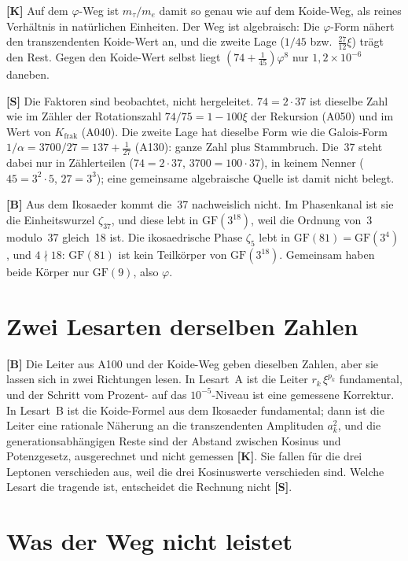 \textbf{[K]} Auf dem $\varphi$-Weg ist $m_\tau/m_e$ damit so genau wie auf dem
Koide-Weg, als reines Verhältnis in natürlichen Einheiten. Der Weg ist
algebraisch: Die $\varphi$-Form nähert den transzendenten Koide-Wert an, und
die zweite Lage ($1/45$ bzw.\ $\tfrac{27}{12}\xi$) trägt den Rest. Gegen den
Koide-Wert selbst liegt $(74+\tfrac1{45})\varphi^8$ nur $1{,}2\times10^{-6}$
daneben.

\textbf{[S]} Die Faktoren sind beobachtet, nicht hergeleitet. $74=2\cdot37$ ist
dieselbe Zahl wie im Zähler der Rotationszahl $74/75=1-100\xi$ der Rekursion
(A050) und im Wert von $K_\text{frak}$ (A040). Die zweite Lage hat dieselbe
Form wie die Galois-Form $1/\alpha=3700/27=137+\tfrac1{27}$ (A130): ganze Zahl
plus Stammbruch. Die~37 steht dabei nur in Zählerteilen ($74=2\cdot37$,
$3700=100\cdot37$), in keinem Nenner ($45=3^2\cdot5$, $27=3^3$); eine
gemeinsame algebraische Quelle ist damit nicht belegt.

\textbf{[B]} Aus dem Ikosaeder kommt die~37 nachweislich nicht. Im Phasenkanal
ist sie die Einheitswurzel $\zeta_{37}$, und diese lebt in
$\mathrm{GF}(3^{18})$, weil die Ordnung von~3 modulo~37 gleich~18 ist. Die
ikosaedrische Phase $\zeta_5$ lebt in $\mathrm{GF}(81)=\mathrm{GF}(3^4)$, und
$4\nmid18$: $\mathrm{GF}(81)$ ist kein Teilkörper von $\mathrm{GF}(3^{18})$.
Gemeinsam haben beide Körper nur $\mathrm{GF}(9)$, also $\varphi$.

\section{Zwei Lesarten derselben Zahlen}

\textbf{[B]} Die Leiter aus A100 und der Koide-Weg geben dieselben Zahlen, aber
sie lassen sich in zwei Richtungen lesen. In Lesart~A ist die
Leiter $r_k\,\xi^{p_k}$ fundamental, und der Schritt vom Prozent- auf das
$10^{-5}$-Niveau ist eine gemessene Korrektur. In Lesart~B ist die
Koide-Formel aus dem Ikosaeder fundamental; dann ist die Leiter eine rationale
Näherung an die transzendenten Amplituden $a_k^2$, und die generationsabhängigen
Reste sind der Abstand zwischen Kosinus und Potenzgesetz, ausgerechnet und
nicht gemessen \textbf{[K]}. Sie fallen für die drei Leptonen verschieden aus,
weil die drei Kosinuswerte verschieden sind. Welche Lesart die tragende ist,
entscheidet die Rechnung nicht \textbf{[S]}.

\section{Was der Weg nicht leistet}


